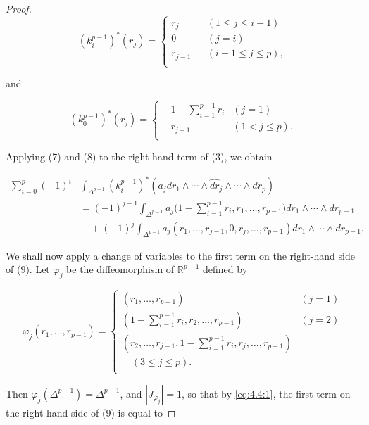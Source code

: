 \begin{proof}
\begin{equation}
\tag{7}\label{eq:4.7:7}
(k_{i}^{p-1})^{*}(r_{j})=\left\{\begin{matrix}{r_{j}}&{}&{(1\leq j\leq i-1)}\\ {0}&{}&{(j=i)}\\ {r_{j-1}}&{}&{(i+1\leq j\leq p),}\\ \end{matrix}\right.
\end{equation}

and

\begin{equation}
\tag{8}\label{eq:4.7:8}
(k_{0}^{p-1})^{*}(r_{j})=\left\{\begin{aligned}{}&{{}1-\sum_{i=1}^{p-1}r_{i}}&{(j=1)}\\ {}&{{}r_{j-1}}&{(1<j\leq p).}\\ \end{aligned}\right.
\end{equation}

Applying (7) and (8) to the right-hand term of (3), we obtain


\begin{align*}\sum_{i=0}^{p}(-1)^{i}&\int_{\Delta^{p-1}}(k_{i}^{p-1})^{*}(a_{j} dr_{1}\wedge\cdots\wedge\widehat{dr}_{j}\wedge\cdots\wedge dr_{p})\\&=(-1)^{j-1}\int_{\Delta^{p-1}}a_{j}\bigg(1-\sum_{i=1}^{p-1}r_{i},r_{1},\ldots,r_{p-1}\bigg)dr_{1}\wedge\cdots\wedge dr_{p-1}\\&\quad+(-1)^{j}\int_{\Delta^{p-1}}a_{j}(r_{1},\ldots,r_{j-1},0,r_{j},\ldots,r_{p-1})dr_{1}\wedge\cdots\wedge dr_{p-1}.\end{align*}


We shall now apply a change of variables to the first term on the right-hand side of (9). Let $\varphi_{j}$ be the diffeomorphism of $\mathbb{R}^{p-1}$ defined by

\[
\varphi_{j}(r_{1},\ldots,r_{p-1})=\begin{cases}{(r_{1},\ldots,r_{p-1})}&{(j=1)}\\ {\left(1-\displaystyle\sum_{i=1}^{p-1}r_{i},r_{2},\ldots,r_{p-1}\right)}&{(j=2)}\\ {\left(r_{2},\ldots,r_{j-1},1-\displaystyle\sum_{i=1}^{p-1}r_{i},r_{j},\ldots,r_{p-1}\right)}&{}\\ {\quad(3\leq j\leq p).}\\ \end{cases}
\]

Then  $\varphi_j(\Delta^{p-1}) = \Delta^{p-1}$, and $|J_{\varphi_j}| = 1$, so that by \eqref{eq:4.4:1}, the first term on the right-hand side of (9) is equal to


\end{proof}
